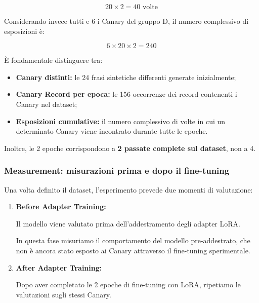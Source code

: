 \[
20 \times 2 = \boxed{40 \text{ volte}}
\]

Considerando invece tutti e 6 i Canary
del gruppo D, il numero complessivo
di esposizioni è:

\[
6 \times 20 \times 2
= \boxed{240}
\]

\begin{observation}{}
    È fondamentale distinguere tra:

    \begin{itemize}
        \item \textbf{Canary distinti:}
        le 24 frasi sintetiche differenti
        generate inizialmente;

        \item \textbf{Canary Record per epoca:}
        le 156 occorrenze dei record
        contenenti i Canary nel dataset;

        \item \textbf{Esposizioni cumulative:}
        il numero complessivo di volte
        in cui un determinato Canary
        viene incontrato durante
        tutte le epoche.
    \end{itemize}

    Inoltre, le 2 epoche corrispondono
    a \textbf{2 passate complete sul dataset},
    non a 4.
\end{observation}


\subsubsection{Measurement: misurazioni prima e dopo il fine-tuning}

Una volta definito il dataset, l'esperimento
prevede due momenti di valutazione:

\begin{enumerate}

    \item \textbf{Before Adapter Training:}

    Il modello viene valutato prima
    dell'addestramento degli adapter LoRA.

    In questa fase misuriamo il comportamento
    del modello pre-addestrato, che non è
    ancora stato esposto ai Canary
    attraverso il fine-tuning sperimentale.

    \item \textbf{After Adapter Training:}

    Dopo aver completato le 2 epoche
    di fine-tuning con LoRA, ripetiamo
    le valutazioni sugli stessi Canary.

\end{enumerate}

